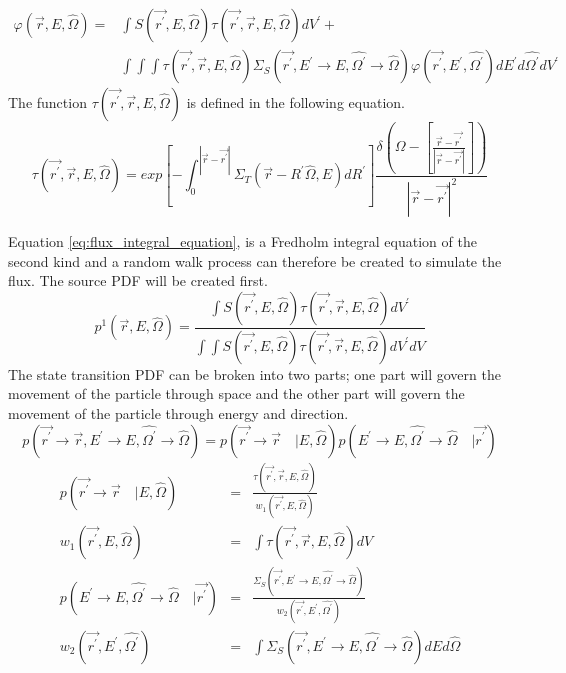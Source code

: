 \begin{equation}
  \begin{split}
    \varphi(\vec{r},E,\hat{\Omega}) = & \int S(\vec{r^{'}},E,\hat{\Omega})
    \tau(\vec{r^{'}},\vec{r},E,\hat{\Omega}) dV^{'} + \\
    & \int\int\int \tau(\vec{r^{'}},\vec{r},E,\hat{\Omega})
    \Sigma_S(\vec{r^{'}},E^{'} \to E, \hat{\Omega^{'}} \to \hat{\Omega})
    \varphi(\vec{r^{'}},E^{'},\hat{\Omega^{'}}) dE^{'} d\hat{\Omega^{'}} dV^{'}
  \end{split}
  \label{eq:flux_integral_equation}
\end{equation}
The function $\tau(\vec{r^{'}},\vec{r},E,\hat{\Omega})$ is defined in the following 
equation.
\begin{equation}
  \tau(\vec{r^{'}},\vec{r},E,\hat{\Omega}) = 
  exp\left[-\int_0^{|\vec{r} - \vec{r^{'}}|} 
              \Sigma_T(\vec{r}-R^{'}\hat{\Omega},E)dR^{'} \right]
    \frac{\delta \left(\Omega - \left[\frac{\vec{r} - \vec{r^{'}}}
        {|\vec{r} - \vec{r^{'}}|}\right]\right)} 
    {|\vec{r} - \vec{r^{'}}|^2}
  \label{eq:unnormalized_transport_kernel}
\end{equation}

Equation \ref{eq:flux_integral_equation}, is a Fredholm integral equation of
the second kind and a random walk process can therefore be created to simulate
the flux. The source PDF will be created first. 
\begin{equation}
  p^1(\vec{r},E,\hat{\Omega}) = \frac{\int S(\vec{r^{'}},E,\hat{\Omega})
    \tau(\vec{r^{'}},\vec{r},E,\hat{\Omega}) dV^{'}}{\int\int S(\vec{r^{'}},E,\hat{\Omega})
    \tau(\vec{r^{'}},\vec{r},E,\hat{\Omega}) dV^{'} dV}
\end{equation}
The state transition PDF can be broken into two parts; one part will govern the
movement of the particle through space and the other part will govern the 
movement of the particle through energy and direction.
\begin{equation*}
  p(\vec{r^{'}} \to \vec{r}, E^{'} \to E, \hat{\Omega^{'}} \to \hat{\Omega}) = 
  p(\vec{r^{'}} \to \vec{r}\quad| E,\hat{\Omega})
  p(E^{'} \to E, \hat{\Omega^{'}} \to \hat{\Omega}\quad|\vec{r^{'}})
\end{equation*}
\begin{eqnarray}
  p(\vec{r^{'}} \to \vec{r}\quad | E,\hat{\Omega}) & = & 
  \frac{\tau(\vec{r^{'}},\vec{r},E,\hat{\Omega})}{w_1(\vec{r^{'}},E,\hat{\Omega})}  \\
  w_1(\vec{r^{'}},E,\hat{\Omega}) & = & \int \tau(\vec{r^{'}},\vec{r},E,\hat{\Omega}) dV \\
  p(E^{'} \to E, \hat{\Omega^{'}} \to \hat{\Omega}\quad|\vec{r^{'}}) & = &
  \frac{\Sigma_S(\vec{r^{'}},E^{'} \to E, \hat{\Omega^{'}} \to \hat{\Omega})}
       {w_2(\vec{r^{'}},E^{'},\hat{\Omega^{'}})} \\
  w_2(\vec{r^{'}},E^{'},\hat{\Omega^{'}}) & = & \int 
  \Sigma_S(\vec{r^{'}},E^{'} \to E, \hat{\Omega^{'}} \to \hat{\Omega}) 
  dE d\hat{\Omega}
\end{eqnarray}

